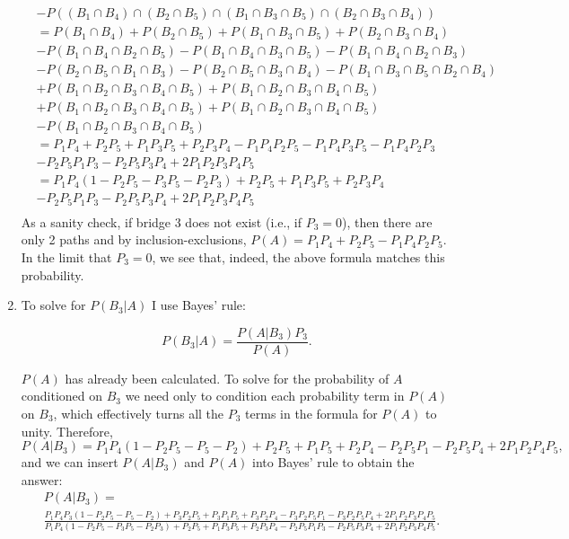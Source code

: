 \begin{problem}{32}
\begin{enumerate}
\begin{align*}
& - P((B_1\cap B_4) \cap (B_2\cap B_5) \cap (B_1 \cap B_3 \cap B_5) \cap (B_2 \cap B_3 \cap B_4) ) \\
&= P(B_1\cap B_4)+ P(B_2\cap B_5)+P(B_1 \cap B_3 \cap B_5)+P(B_2 \cap B_3 \cap B_4) \\
&- P(B_1\cap B_4\cap B_2\cap B_5)-P(B_1\cap B_4 \cap B_3 \cap B_5)-P(B_1\cap B_4\cap B_2 \cap B_3)\\
&-P(B_2\cap B_5 \cap B_1 \cap B_3 )-P(B_2\cap B_5 \cap B_3 \cap B_4)-P(B_1 \cap B_3 \cap B_5 \cap B_2 \cap B_4) \\
&+P(B_1\cap B_2 \cap B_3 \cap B_4 \cap B_5)+P(B_1\cap B_2 \cap B_3 \cap B_4 \cap B_5)\\
&+P(B_1\cap B_2 \cap B_3 \cap B_4 \cap B_5)+P(B_1\cap B_2 \cap B_3 \cap B_4 \cap B_5) \\
& - P(B_1\cap B_2 \cap B_3 \cap B_4 \cap B_5) \\
&= P_1 P_4+ P_2 P_5+P_1 P_3 P_5+P_2 P_3 P_4 - P_1 P_4 P_2 P_5-P_1 P_4 P_3 P_5-P_1 P_4 P_2 P_3\\
&-P_2 P_5 P_1 P_3 -P_2 P_5 P_3 P_4+2P_1 P_2 P_3 P_4 P_5  \\
&= P_1 P_4(1- P_2 P_5 -P_3 P_5-P_2 P_3)+ P_2 P_5+P_1 P_3 P_5+P_2 P_3 P_4 \\
&-P_2 P_5 P_1 P_3 -P_2 P_5 P_3 P_4+2P_1 P_2 P_3 P_4 P_5  \\
\end{align*}
As a sanity check, if bridge 3 does not exist (i.e., if $P_3 = 0$), then there are only 2 paths and by inclusion-exclusions, $P(A) = P_1 P_4+P_2 P_5 -P_1P_4P_2P_5$.  In the limit that $P_3=0$, we see that, indeed, the above formula matches this probability.  

\item To solve for $P(B_3|A)$ I use Bayes' rule:

\begin{equation*}
P(B_3|A) = \frac{P(A|B_3) P_3}{P(A)}.
\end{equation*}

$P(A)$ has already been calculated.  To solve for the probability of $A$ conditioned on $B_3$ we need only to condition each probability term in $P(A)$ on $B_3$, which effectively turns all the $P_3$ terms in the formula for $P(A)$ to unity.  Therefore,
\begin{equation*}
P(A|B_3) = P_1 P_4(1- P_2 P_5 -P_5-P_2)+ P_2 P_5+P_1 P_5+P_2 P_4 -P_2 P_5 P_1  -P_2 P_5 P_4+2P_1 P_2 P_4 P_5,
\end{equation*}
and we can insert $P(A|B_3)$ and $P(A)$ into Bayes' rule to obtain the answer:
\begin{align*}
&P(A|B_3) = \\
&\frac{P_1 P_4 P_3(1- P_2 P_5 -P_5-P_2)+ P_3 P_2 P_5+P_3 P_1 P_5+P_3 P_2 P_4 -P_3 P_2 P_5 P_1  -P_3 P_2 P_5 P_4+2P_1 P_2 P_3 P_4 P_5}{P_1 P_4(1- P_2 P_5 -P_3 P_5-P_2 P_3)+ P_2 P_5+P_1 P_3 P_5+P_2 P_3 P_4-P_2 P_5 P_1 P_3 -P_2 P_5 P_3 P_4+2P_1 P_2 P_3 P_4 P_5}.
\end{align*}



\end{enumerate}

\end{problem}

